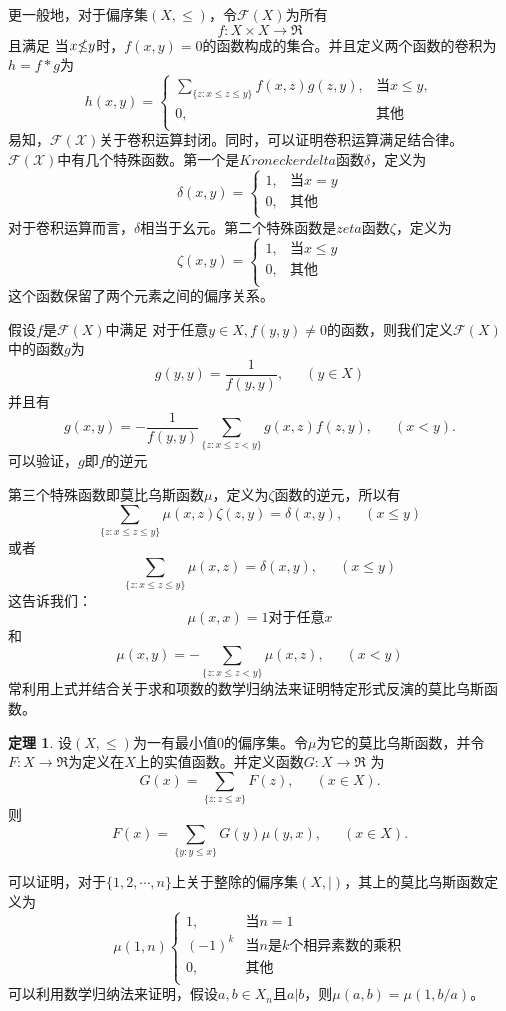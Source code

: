 \documentclass[a4paper,11pt]{article}%
\theoremstyle{remark}
\theoremstyle{remark}
\theoremstyle{definition}
\newtheorem{theorem}{定理}[section]
\theoremstyle{definition}
\theoremstyle{definition}
\begin{document}
更一般地，对于偏序集$(X,\leq)$，令$\mathcal{F}(X)$为所有
\[f:X\times X\rightarrow\mathfrak{R}\]
且满足 当$x\slashed{\leq}y$时，$f(x,y)=0$的函数构成的集合。并且定义两个函数的卷积为$h=f* g$为 
\[ 
    h(x,y)=\begin{cases}
        \sum_{\{z:x\leq z\leq y\}}f(x,z)g(z,y),&\text{当}x\leq y,\\
        0,& \text{其他}\\
    \end{cases}\]
易知，$\mathcal{F(X)}$关于卷积运算封闭。同时，可以证明卷积运算满足结合律。$\mathcal{F(X)}$中有几个特殊函数。第一个是$Kronecker delta$函数$\delta$，定义为 
\[ 
    \delta(x,y)=\begin{cases}
        1,& \text{当}x=y\\
        0,& \text{其他}\\
    \end{cases}\]
    对于卷积运算而言，$\delta$相当于幺元。第二个特殊函数是$zeta$函数$\zeta$，定义为 
    \[ 
        \zeta(x,y)=\begin{cases}
            1,& \text{当}x\leq y\\
            0,& \text{其他}\\
        \end{cases}\]
        这个函数保留了两个元素之间的偏序关系。
        
        假设$f$是$\mathcal{F}(X)$中满足 对于任意$y\in X,f(y,y)\neq 0$的函数，则我们定义$\mathcal{F}(X)$中的函数$g$为
        \[g(y,y)=\frac{1}{f(y,y)},\phantom{111}(y\in X)\]
        并且有 
        \[g(x,y)=-\frac{1}{f(y,y)}\sum_{\{z:x\leq z<y\}}g(x,z)f(z,y),\phantom{111}(x<y).\]
        可以验证，$g$即$f$的逆元

        第三个特殊函数即莫比乌斯函数$\mu$，定义为$\zeta$函数的逆元，所以有
        \[\sum_{\{z:x\leq z\leq y\}}\mu(x,z)\zeta(z,y)=\delta (x,y),\phantom{111}(x\leq y)\]
        或者
        \[\sum_{\{z:x\leq z\leq y\}}\mu(x,z)=\delta (x,y),\phantom{111}(x\leq y)\]
        这告诉我们：
        \[\mu(x,x)=1 \text{对于任意}x\]
        和
        \[\mu(x,y)=-\sum_{\{z:x\leq z< y\}}\mu(x,z),\phantom{111}(x<y)\]
        常利用上式并结合关于求和项数的数学归纳法来证明特定形式反演的莫比乌斯函数。
        \begin{theorem}
            设$(X,\leq)$为一有最小值$0$的偏序集。令$\mu$为它的莫比乌斯函数，并令$F:X\rightarrow\mathfrak{R}$为定义在$X$上的实值函数。并定义函数$G:X\rightarrow \mathfrak{R}$
            为
            \[G(x)=\sum_{\{z:z\leq x\}}F(z),\phantom{111}(x\in X).\]
            则 
            \[F(x)=\sum_{\{y:y\leq x\}}G(y)\mu(y,x),\phantom{111}(x\in X).\]
        \end{theorem}
        可以证明，对于$\{1,2,\cdots,n\}$上关于整除的偏序集$(X,|)$，其上的莫比乌斯函数定义为
        \[\mu(1,n)
        \begin{cases}
            1,& \text{当}n=1\\
            (-1)^k& \text{当}n \text{是} k \text{个相异素数的乘积}\\
            0,& \text{其他}\\
        \end{cases}\] 
        可以利用数学归纳法来证明，假设$a,b\in X_n$且$a|b$，则$\mu(a,b)=\mu(1,b/a)$。
\end{document}

